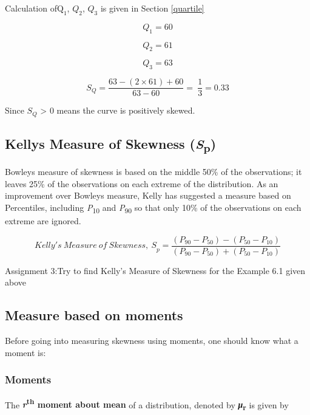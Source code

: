 \documentclass[
]{book}
\begin{document}
Calculation of\(\text{Q}_{1}\), \(Q_{2}\), \(Q_{3}\) is given in Section \ref{quartile}

\[{Q}_{1} = 60\]

\[Q_{2} = 61\]

\[Q_{3} = 63\]

\[S_{Q} = \frac{63 - (2 \times 61) + 60}{63 - 60} = \ \frac{1}{3} = 0.33\]

Since \(S_{Q}\) \textgreater{} 0 means the curve is positively skewed.

\hypertarget{kellys-measure-of-skewness-sp}{%
\subsection{\texorpdfstring{Kelly\textquotesingle s Measure of Skewness (\emph{S}\textsubscript{p})}{Kelly\textquotesingle s Measure of Skewness (Sp)}}\label{kellys-measure-of-skewness-sp}}

Bowley\textquotesingle s measure of skewness is based on the middle 50\% of the
observations; it leaves 25\% of the observations on each extreme of the
distribution. As an improvement over Bowley\textquotesingle s measure, Kelly has
suggested a measure based on Percentiles, including \emph{P}\textsubscript{10} and \emph{P}\textsubscript{90}
so that only 10\% of the observations on each extreme are ignored.

\[{Kelly's\ Measure\ of\ Skewness,\ S}_{p} = \frac{\left( P_{90} - P_{50} \right) - \left( P_{50} - P_{10} \right)}{\left( P_{90} - P_{50} \right) + \left( P_{50} - P_{10} \right)}\]

\begin{rmdnote}
Assignment 3:Try to find Kelly's Measure of Skewness
for the Example 6.1 given above
\end{rmdnote}

\hypertarget{measure-based-on-moments}{%
\subsection{Measure based on moments}\label{measure-based-on-moments}}

Before going into measuring skewness using moments, one should know what
a moment is:

\hypertarget{moments}{%
\subsubsection{Moments}\label{moments}}

The \textbf{\emph{r}\textsuperscript{th} moment about mean} of a distribution, denoted by
\textbf{\emph{μ}\textsubscript{r}} is given by
\end{document}
